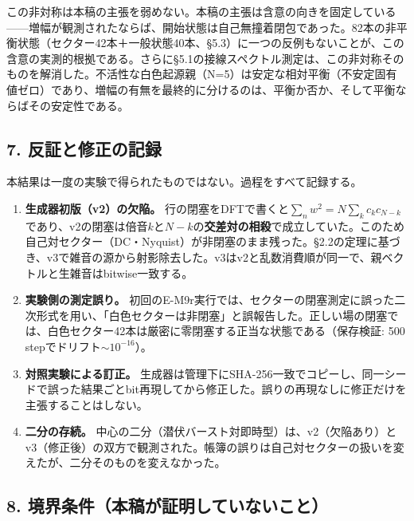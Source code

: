 \documentclass[
  a4paper,
]{ltjsarticle}
\providecommand{\tightlist}{%
  \setlength{\itemsep}{0pt}\setlength{\parskip}{0pt}}
\begin{document}
この非対称は本稿の主張を弱めない。本稿の主張は含意の向きを固定している------増幅が観測されたならば、開始状態は自己無撞着閉包であった。82本の非平衡状態（セクター42本＋一般状態40本、§5.3）に一つの反例もないことが、この含意の実測的根拠である。さらに§5.1の接線スペクトル測定は、この非対称そのものを解消した。不活性な白色起源親（N=5）は安定な相対平衡（不安定固有値ゼロ）であり、増幅の有無を最終的に分けるのは、平衡か否か、そして平衡ならばその安定性である。

\subsection{7.
反証と修正の記録}\label{ux53cdux8a3cux3068ux4feeux6b63ux306eux8a18ux9332}

本結果は一度の実験で得られたものではない。過程をすべて記録する。

\begin{enumerate}
\def\labelenumi{\arabic{enumi}.}
\tightlist
\item
  \textbf{生成器初版（v2）の欠陥。}
  行の閉塞をDFTで書くと\(\sum_n w^2=N\sum_k c_kc_{N-k}\)であり、v2の閉塞は倍音\(k\)と\(N-k\)の\textbf{交差対の相殺}で成立していた。このため自己対セクター（DC・Nyquist）が非閉塞のまま残った。§2.2の定理に基づき、v3で雑音の源から射影除去した。v3はv2と乱数消費順が同一で、親ベクトルと生雑音はbitwise一致する。
\item
  \textbf{実験側の測定誤り。}
  初回のE-M9r実行では、セクターの閉塞測定に誤った二次形式を用い、「白色セクターは非閉塞」と誤報告した。正しい場の閉塞では、白色セクター42本は厳密に零閉塞する正当な状態である（保存検証:
  500 stepでドリフト\(\sim10^{-16}\)）。
\item
  \textbf{対照実験による訂正。}
  生成器は管理下にSHA-256一致でコピーし、同一シードで誤った結果ごとbit再現してから修正した。誤りの再現なしに修正だけを主張することはしない。
\item
  \textbf{二分の存続。}
  中心の二分（潜伏バースト対即時型）は、v2（欠陥あり）とv3（修正後）の双方で観測された。帳簿の誤りは自己対セクターの扱いを変えたが、二分そのものを変えなかった。
\end{enumerate}

\subsection{8.
境界条件（本稿が証明していないこと）}\label{ux5883ux754cux6761ux4ef6ux672cux7a3fux304cux8a3cux660eux3057ux3066ux3044ux306aux3044ux3053ux3068}
\end{document}
